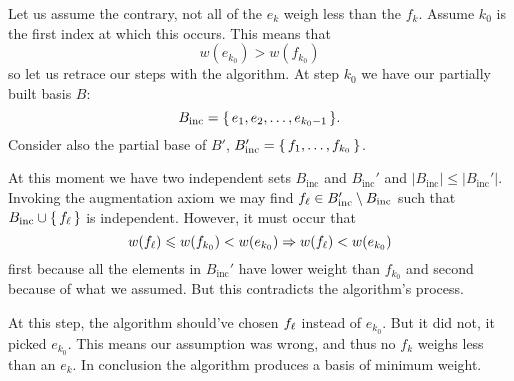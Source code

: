 \documentclass[12pt]{memoir}
\begin{document}
\begin{ptcbr}
    Let us assume the contrary, not all of the $e_k$ weigh less than the $f_k$. Assume $k_0$ is the first index at which this occurs. This means that 
    $$w(e_{k_0})>w(f_{k_0})$$
    so let us retrace our steps with the algorithm. At step $k_0$ we have our partially built basis $B$:
    $$B_{\text{inc}}=\{\,e_1,e_2,\dots,e_{k_0-1}\,\}.$$
    Consider also the partial base of $B'$, $B'_{\text{inc}}=\{\,f_1,\dots,f_{k_0}\,\}$.\par 
    At this moment we have two independent sets $B_{\text{inc}}$ and $B_{\text{inc}}'$ and $|B_{\text{inc}}|\leq|B_{\text{inc}}'|$. Invoking the augmentation axiom we may find $f_\ell\in B_{\text{inc}}'\setminus B_{\text{inc}}$ such that $B_{\text{inc}}\cup\{\,f_\ell\,\}$ is independent. However, it must occur that 
    $$w(f_\ell)\leqslant w(f_{k_0})<w(e_{k_0})\Rightarrow w(f_\ell)<w(e_{k_0})$$
    first because all the elements in $B_{\text{inc}}'$ have lower weight than $f_{k_0}$ and second because of what we assumed. But this contradicts the algorithm's process.\par 
    At this step, the algorithm should've chosen $f_\ell$ instead of $e_{k_0}$. But it did not, it picked $e_{k_0}$. This means our assumption was wrong, and thus no $f_k$ weighs less than an $e_k$. In conclusion the algorithm produces a basis of minimum weight. 
\end{ptcbr}
\end{document}
